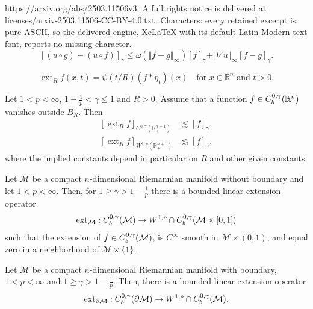 \documentclass[10pt,a4paper]{amsart}
\def\ext{\operatorname{ext}}
\newcommand{\R}{\mathbb R}
\newcommand{\bbbr}{\mathbb R}
\newcommand{\cM}{\mathcal M}
\begin{document}
https://arxiv.org/abs/2503.11506v3. A full rights notice is delivered at licenses/arxiv-2503.11506-CC-BY-4.0.txt. Characters: every retained excerpt is pure ASCII, so the delivered engine, XeLaTeX with its default Latin Modern text font, reports no missing character.
\begin{equation}
\label{eq23}
[(u\circ g)-(u\circ f)]_{\gamma}\leq\omega(\Vert f-g\Vert_\infty)[f]_{\gamma}+
\Vert\nabla u\Vert_\infty [f-g]_{\gamma}.
\end{equation}

\begin{equation}
\label{eq36}
\ext_R f(x,t)=\psi(t/R)(f*\eta_t)(x)
\quad
\text{for $x\in \bbbr^n$ and $t>0$.}
\end{equation}

\begin{lemma}
\label{T5}
Let $1<p<\infty$, $1-\frac{1}{p}<\gamma\leq 1$ and $R>0$. Assume that a function $f\in C_{\rm b}^{0,\gamma}(\R^n)$ vanishes outside $B_R$. Then
\begin{align}
\label{eq6}
[\ext_R f]_{C^{0,\gamma}(\R^{n+1}_+)}
&\lesssim [f]_{\gamma},\\
\label{eq7}
[\ext_R f]_{W^{1,p}(\bbbr^{n+1}_+)}
&\lesssim [f]_{\gamma},
\end{align}
where the implied constants depend in particular on $R$ and other given constants.
\end{lemma}

\begin{proposition}
\label{T6}
Let $\cM$ be a compact $n$-dimensional Riemannian manifold without boundary and let $1<p<\infty$.
Then, for $1\geq \gamma> 1-\frac{1}{p}$ there is a bounded linear extension operator
$$
\ext_{\cM}: C_{\rm b}^{0,\gamma}(\cM)\to W^{1,p}\cap C_{\rm b}^{0,\gamma}(\cM\times [0,1])
$$
such that the extension of $f\in C_{\rm b}^{0,\gamma}(\cM)$, is $C^\infty$ smooth in $\cM\times (0,1)$, and equal zero in a neighborhood of $\cM\times\{ 1\}$. 
\end{proposition}

\begin{corollary}
\label{T57}
Let $\cM$ be a compact $n$-dimensional Riemannian manifold with boundary, $1<p<\infty$ and 
$1\geq \gamma> 1-\frac{1}{p}$. Then, there is a bounded linear extension operator
$$
\ext_{\partial\cM}: C_{\rm b}^{0,\gamma}(\partial\cM)\to W^{1,p}\cap C_{\rm b}^{0,\gamma}(\cM).
$$
\end{corollary}
\end{document}
